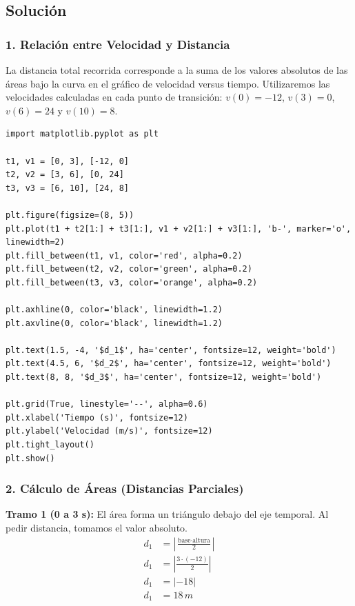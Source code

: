 \documentclass[12pt, a4paper]{article}
\begin{document}
\subsection*{Solución}

\subsubsection*{1. Relación entre Velocidad y Distancia}
La distancia total recorrida corresponde a la suma de los valores absolutos de las áreas bajo la curva en el gráfico de velocidad versus tiempo. Utilizaremos las velocidades calculadas en cada punto de transición: $v(0)=-12$, $v(3)=0$, $v(6)=24$ y $v(10)=8$.

\begin{lstlisting}
import matplotlib.pyplot as plt

t1, v1 = [0, 3], [-12, 0]
t2, v2 = [3, 6], [0, 24]
t3, v3 = [6, 10], [24, 8]

plt.figure(figsize=(8, 5))
plt.plot(t1 + t2[1:] + t3[1:], v1 + v2[1:] + v3[1:], 'b-', marker='o', linewidth=2)
plt.fill_between(t1, v1, color='red', alpha=0.2)
plt.fill_between(t2, v2, color='green', alpha=0.2)
plt.fill_between(t3, v3, color='orange', alpha=0.2)

plt.axhline(0, color='black', linewidth=1.2)
plt.axvline(0, color='black', linewidth=1.2)

plt.text(1.5, -4, '$d_1$', ha='center', fontsize=12, weight='bold')
plt.text(4.5, 6, '$d_2$', ha='center', fontsize=12, weight='bold')
plt.text(8, 8, '$d_3$', ha='center', fontsize=12, weight='bold')

plt.grid(True, linestyle='--', alpha=0.6)
plt.xlabel('Tiempo (s)', fontsize=12)
plt.ylabel('Velocidad (m/s)', fontsize=12)
plt.tight_layout()
plt.show()
\end{lstlisting}

\subsubsection*{2. Cálculo de Áreas (Distancias Parciales)}

\textbf{Tramo 1 (0 a 3 s):}
El área forma un triángulo debajo del eje temporal. Al pedir distancia, tomamos el valor absoluto.
\begin{align*}
d_1 &= \left| \frac{\text{base} \cdot \text{altura}}{2} \right| \\
d_1 &= \left| \frac{3 \cdot (-12)}{2} \right| \\
d_1 &= \left| -18 \right| \\
d_1 &= 18 \, \si{m}
\end{align*}
\end{document}
